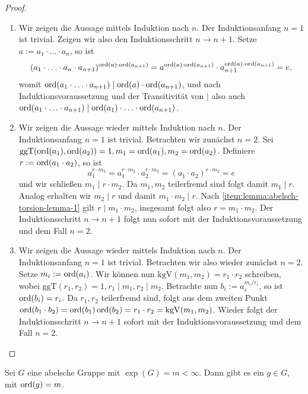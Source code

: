 \begin{proof}{\ }
    \begin{enumerate}
        \item Wir zeigen die Aussage mittels Induktion nach $n$. Der Induktionsanfang $n=1$ ist trivial. Zeigen wir also den Induktionsschritt $n \to n + 1$. Setze $a := a_1 \cdot \hdots \cdot a_n$, so ist
        $$ (a_1 \cdot \hdots \cdot a_n \cdot a_{n+1})^{\operatorname{ord}(a) \cdot \operatorname{ord}(a_{n+1})} = a^{\operatorname{ord}(a) \cdot \operatorname{ord}(a_{n+1})} \cdot a_{n+1}^{\operatorname{ord}(a) \cdot \operatorname{ord}(a_{n+1})} = e, $$
        womit $\operatorname{ord}(a_1 \cdot \hdots \cdot a_{n+1}) \mid \operatorname{ord}(a) \cdot \operatorname{ord}(a_{n+1})$, und nach Induktionsvoraussetzung und der Transitivität von $\mid$ also auch $\operatorname{ord}(a_1 \cdot \hdots \cdot a_{n+1}) \mid \operatorname{ord}(a_1) \cdot \hdots \cdot \operatorname{ord}(a_{n+1})$.

        \item Wir zeigen die Aussage wieder mittels Induktion nach $n$. Der Induktionsanfang $n=1$ ist trivial. Betrachten wir zunächst $n=2$. Sei $\mathrm{ggT}(\operatorname{ord}(a_1), \operatorname{ord}(a_2)) = 1, m_1 = \operatorname{ord}(a_1), m_2 = \operatorname{ord}(a_2)$. Definiere $r := \operatorname{ord}(a_1 \cdot a_2)$, so ist
        $$ a_1^{r \cdot m_2} = a_1^{r \cdot m_2} \cdot a_2^{r \cdot m_2} = (a_1 \cdot a_2)^{r \cdot m_2} = e $$
        und wir schließen $m_1 \mid r \cdot m_2$. Da $m_1, m_2$ teilerfremd sind folgt damit $m_1 \mid r$. Analog erhalten wir $m_2 \mid r$ und damit $m_1 \cdot m_2 \mid r$. Nach \ref*{item:lemma:abelsch-torsion-lemma-1} gilt $r \mid m_1 \cdot m_2$, insgesamt folgt also $r = m_1 \cdot m_2$. Der Induktionsschritt $n \to n+1$ folgt nun sofort mit der Induktionsvoraussetzung und dem Fall $n=2$.

        \item Wir zeigen die Aussage wieder mittels Induktion nach $n$. Der Induktionsanfang $n=1$ ist trivial. Betrachten wir also wieder zunächst $n=2$. Setze $m_i := \operatorname{ord}(a_i)$. Wir können nun $\mathrm{kgV}(m_1, m_2) = r_1 \cdot r_2$ schreiben, wobei $\mathrm{ggT}(r_1, r_2) = 1, r_1 \mid m_1, r_2 \mid m_2$. Betrachte nun $b_i := a_i^{m_i / r_i}$, so ist $\operatorname{ord}(b_i) = r_i$. Da $r_1, r_2$ teilerfremd sind, folgt aus dem zweiten Punkt $\operatorname{ord}(b_1 \cdot b_2) = \operatorname{ord}(b_1) \operatorname{ord}(b_2) = r_1 \cdot r_2 = \mathrm{kgV}(m_1, m_2)$. Wieder folgt der Induktionsschritt $n \to n+1$ sofort mit der Induktionsvoraussetzung und dem Fall $n=2$. 
    \end{enumerate}
\end{proof}

\begin{corollary}
    Sei $G$ eine abelsche Gruppe mit $\exp(G) = m < \infty$. Dann gibt es ein $g \in G$, mit $\operatorname{ord}(g) = m$.
\end{corollary}

